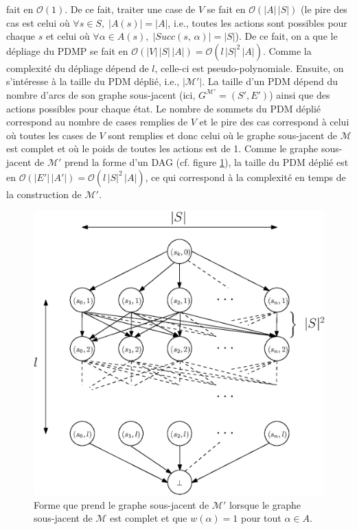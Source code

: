 \documentclass[12pt,a4paper]{report}
\theoremstyle{definition}%
\theoremstyle{remark}
\begin{document}
fait en $\mathcal{O}(1)$. De ce fait, traiter une case de $V$ se fait en $\mathcal{O}(|A| \, |S|)$ (le pire des cas est celui où $\forall s \in S, \; |A(s)| = |A|$, i.e., toutes les actions sont possibles pour chaque $s$ et
celui où $\forall \alpha \in A(s), \; |Succ(s, \, \alpha)| = |S|$). De ce fait,
on a que le dépliage du PDMP se fait en $\mathcal{O}(|V| \, |S| \, |A|) = \mathcal{O}(l \, |S|^2 \, |A|)$. Comme la complexité du dépliage dépend de
$l$, celle-ci est pseudo-polynomiale.
Ensuite, on s'intéresse à la taille du PDM déplié, i.e., $|\mathcal{M}'|$.
La taille d'un PDM dépend du nombre d'arcs de son graphe
sous-jacent (ici, $G^{\mathcal{M}'} = (S', E')$) ainsi que des actions possibles pour chaque état. Le nombre de sommets du PDM déplié correspond au nombre
de cases remplies de $V$ et le pire des cas correspond à celui où toutes
les cases de $V$ sont remplies et donc celui où le graphe sous-jacent de $\mathcal{M}$ est
complet et où le poids de toutes les actions est de 1. Comme le graphe sous-jacent de $\mathcal{M}'$ prend la forme d'un DAG (cf. figure \ref{dagporn}), la taille du PDM déplié est en $\mathcal{O}(|E'| \, |A'|) = \mathcal{O}(l \, |S|^2 \, |A|)$, ce qui correspond à la complexité en
temps de la construction de $\mathcal{M}'$.
\begin{figure}[H]
	\centering
	\captionsetup{justification=centering}
	\includegraphics[scale=0.7]{figures/DAGporn}
	\caption{Forme que prend le graphe sous-jacent de $\mathcal{M}'$ lorsque le graphe sous-jacent de $\mathcal{M}$ est complet et que $w(\alpha) = 1$ pour tout $\alpha \in A$.}
	\label{dagporn}
\end{figure}
\end{document}
